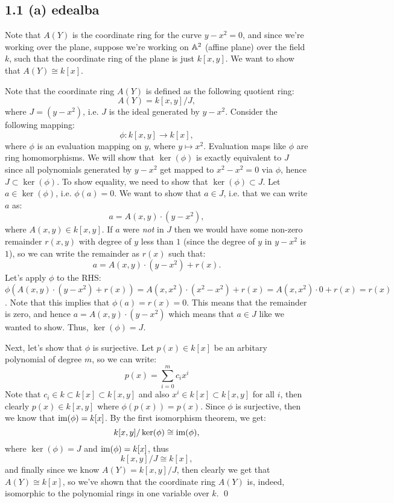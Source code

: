     \subsection*{1.1 (a)   {edealba}}
    
    \hspace{1cm} Note that $A(Y)$ is the coordinate ring for the curve $y-x^2 = 0$, and since we're working over the plane, suppose we're working on $\mathbb{A}^2$ (affine plane) over the field $k$, such that the coordinate ring of the plane is just $k[x, y]$. We want to show that $A(Y) \cong k[x]$.

Note that the coordinate ring $A(Y)$ is defined as the following quotient ring:
$$ A(Y) = k[x, y]/J, $$
where $J = (y-x^2)$, i.e. $J$ is the ideal generated by $y-x^2$. Consider the following mapping:
$$ \phi: k[x, y] \to k[x], $$
where $\phi$ is an evaluation mapping on $y$, where $y \mapsto x^2$. Evaluation maps like $\phi$ are ring homomorphisms. We will show that $\ker(\phi)$ is exactly equivalent to $J$ since all polynomials generated by $y-x^2$ get mapped to $x^2-x^2 = 0$ via $\phi$, hence $J \subset \ker(\phi)$. To show equality, we need to show that $\ker(\phi) \subset J$. Let $a \in \ker(\phi)$, i.e. $\phi(a) = 0$. We want to show that $a \in J$, i.e. that we can write $a$ as:
$$a = A(x, y) \cdot (y-x^2), $$
where $A(x, y) \in k[x, y]$. If $a$ were \emph{not} in $J$ then we would have some non-zero remainder $r(x, y)$ with degree of $y$ less than $1$ (since the degree of $y$ in $y-x^2$ is $1$), so we can write the remainder as $r(x)$ such that:
$$a = A(x, y) \cdot (y-x^2) + r(x). $$
Let's apply $\phi$ to the RHS: $\phi(A(x, y) \cdot (y-x^2) + r(x)) = A(x, x^2)\cdot (x^2-x^2) + r(x) = A(x, x^2)\cdot 0 + r(x) = r(x)$. Note that this implies that $\phi(a) = r(x) = 0$. This means that the remainder is zero, and hence $a = A(x, y)\cdot(y-x^2)$ which means that $a \in J$ like we wanted to show. Thus, $\ker(\phi) = J$.

Next, let's show that $\phi$ is surjective. Let $p(x) \in k[x]$ be an arbitary polynomial of degree $m$, so we can write:
$$ p(x) = \sum_{i=0}^{m} c_ix^{i} $$
Note that $c_i \in k \subset k[x] \subset k[x, y]$ and also $x^i \in k[x] \subset k[x, y]$ for all $i$, then clearly $p(x) \in k[x, y]$ where $\phi(p(x)) = p(x)$. Since $\phi$ is surjective, then we know that $\text{im}(\phi) = k[x]$. By the first isomorphism theorem, we get:
$$ k[x, y] / \ker(\phi) \cong \text{im}(\phi), $$
where $\ker(\phi) = J$ and $\text{im}(\phi) = k[x]$, thus
$$ k[x, y] / J \cong k[x],$$
and finally since we know $A(Y) = k[x, y] / J$, then clearly we get that $A(Y) \cong k[x]$, so we've shown that the coordinate ring $A(Y)$ is, indeed, isomorphic to the polynomial rings in one variable over $k$. \qed

